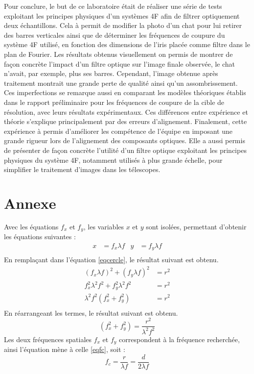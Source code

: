 \documentclass[11pt,letterpaper]{article}
\begin{document}
Pour conclure, le but de ce laboratoire était de réaliser une série de tests exploitant les principes physiques d'un systèmes 4F afin de filtrer optiquement deux échantillons. Cela à permit de modifier la photo d'un chat pour lui retirer des barres verticales ainsi que de déterminer les fréquences de coupure du système 4F utilisé, en fonction des dimensions de l'iris placée comme filtre dans le plan de Fourier. Les résultats obtenus visuellement on permis de montrer de façon concrète l'impact d'un filtre optique sur l'image finale observée, le chat n'avait, par exemple, plus ses barres. Cependant, l'image obtenue après traitement montrait une grande perte de qualité ainsi qu'un assombrissement. Ces imperfections se remarque aussi en comparant les modèles théoriques établis dans le rapport préliminaire pour les fréquences de coupure de la cible de résolution, avec leurs résultats expérimentaux. Ces différences entre expérience et théorie s'explique principalement par des erreurs d'alignement. Finalement, cette expérience à permis d'améliorer les compétence de l'équipe en imposant une grande rigueur lors de l'alignement des composants optiques. Elle a aussi permis de présenter de façon concrète l'utilité d'un filtre optique exploitant les principes physiques du système 4F, notamment utilisés à plus grande échelle, pour simplifier le traitement d'images dans les télescopes. 

\newpage\section*{Annexe}
Avec les équations $f_{x}$ et $f_{y}$, les variables $x$ et $y$ sont isolées, permettant d'obtenir les équations suivantes :
\begin{align*}
  x&=f_{x}\lambda f & y&=f_{y}\lambda f \\
\end{align*}
En remplaçant dans l'équation \ref{eqcercle}, le résultat suivant est obtenu.
\begin{align*}
  (f_{x}\lambda f)^{2}+(f_{y}\lambda f)^{2}&=r^{2} \\
  f_{x}^{2}\lambda^{2}f^{2}+f_{y}^{2}\lambda^{2}f^{2}&=r^{2} \\
  \lambda^{2}f^{2}(f_{x}^{2}+f_{y}^{2})&=r^{2} \\
\end{align*}
En réarrangeant les termes, le résultat suivant est obtenu.
\begin{equation*}
  (f_{x}^{2}+f_{y}^{2})=\frac{r^{2}}{\lambda^{2}f^{2}}
\end{equation*}
Les deux fréquences spatiales $f_{x}$ et $f_{y}$ correspondent à la fréquence recherchée, ainsi l'équation mène à celle \ref{eqfc}, soit :
\begin{equation*}
  f_{c}=\frac{r}{\lambda f}=\frac{d}{2\lambda f}
\end{equation*} 

\clearpage



\end{document}
